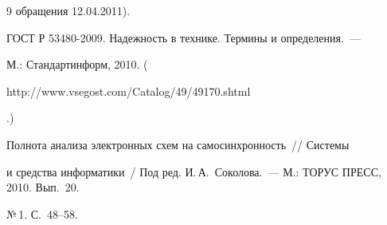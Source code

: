 {{\begin{thebibliography}{9}
обращения 12.04.2011).


      




      ГОСТ Р 53480-2009. Надежность в технике. Термины и определения.~--- 


М.: Стандартинформ, 2010. ({\sf 


http://www.vsegost.com/Catalog/49/49170.shtml}.)





 \label{end\stat}


      






      Полнота анализа электронных схем на самосинхронность~/\!\!/ Системы 


и средства информатики~/ Под ред. И.\,А.~Соколова.~--- М.: ТОРУС ПРЕСС, 2010.   Вып.~20.


№\,1. С.~48--58.


 \end{thebibliography}


}


}       



